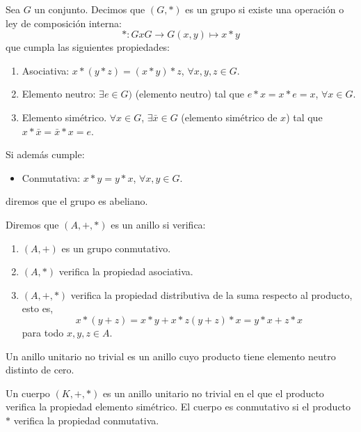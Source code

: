 \documentclass[a4paper,11pt, oneside]{book}
\begin{document}
\begin{grupo}
	Sea $G$ un conjunto. Decimos que $(G,*)$ es un grupo si existe una operación o ley de composición interna:
	\begin{equation}
	*: GxG \rightarrow G
	(x,y) \mapsto x*y
	\end{equation}
	que cumpla las siguientes propiedades:
	\begin{enumerate}
		\item Asociativa: $ x*(y*z) = (x*y)*z$, $\forall x,y,z \in G$.
		\item Elemento neutro: $\exists e \in G)$ (elemento neutro) tal que $e*x = x*e = x$, $\forall x \in G$.
		\item Elemento simétrico. $\forall x \in G$, $\exists \bar{x} \in G$ (elemento simétrico de $x$) tal que $x*\bar{x} = \bar{x}*x= e$.
	\end{enumerate}
	Si además cumple:
	\begin{itemize}
		\item Conmutativa: $x*y = y*x$, $\forall x,y \in G$.
	\end{itemize}
	diremos que el grupo es abeliano.
\end{grupo}
\begin{anillo}
	Diremos que $(A, +, *)$ es un anillo si verifica:
	\begin{enumerate}
	\item $(A, +)$ es un grupo conmutativo.	
	\item $(A, *)$ verifica la propiedad asociativa.
	\item $(A, +, *)$ verifica la propiedad distributiva de la suma respecto al producto, esto es,
	\begin{equation}
	x*(y+z) = x*y +x*z 
	(y+z)*x = y*x + z*x
	\end{equation}
	para todo $x,y,z \in A$.
	\end{enumerate}
	Un anillo unitario no trivial es un anillo cuyo producto tiene elemento neutro distinto de cero.
\end{anillo}
\begin{cuerpo}
	Un cuerpo $(K, +, *)$ es un anillo unitario no trivial en el que el producto verifica la propiedad elemento simétrico. El cuerpo es conmutativo si el producto $*$ verifica la propiedad conmutativa.
\end{cuerpo}
\end{document}

